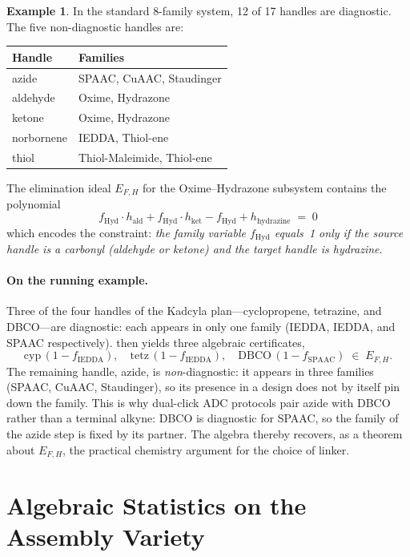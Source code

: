 \documentclass[preprint,12pt]{elsarticle}
\theoremstyle{definition}
\newtheorem{example}[theorem]{Example}
\theoremstyle{remark}
\begin{document}
\begin{example}\label{ex:diagnostic}
In the standard 8-family system, 12 of 17 handles are
diagnostic.  The five non-diagnostic handles are:
\begin{center}
\begin{tabular}{ll}
\toprule
Handle & Families \\
\midrule
azide & SPAAC, CuAAC, Staudinger \\
aldehyde & Oxime, Hydrazone \\
ketone & Oxime, Hydrazone \\
norbornene & IEDDA, Thiol-ene \\
thiol & Thiol-Maleimide, Thiol-ene \\
\bottomrule
\end{tabular}
\end{center}
The elimination ideal $E_{F,H}$ for the Oxime--Hydrazone
subsystem contains the polynomial
\[
  f_{\mathrm{Hyd}} \cdot h_{\mathrm{ald}}
  + f_{\mathrm{Hyd}} \cdot h_{\mathrm{ket}}
  - f_{\mathrm{Hyd}} + h_{\mathrm{hydrazine}} \;=\; 0
\]
which encodes the constraint: \emph{the family variable
$f_{\mathrm{Hyd}}$ equals~1 only if the source handle is a
carbonyl (aldehyde or ketone) and the target handle is hydrazine}.
\end{example}

\paragraph{On the running example.}
Three of the four handles of the Kadcyla plan---cyclopropene,
tetrazine, and DBCO---are diagnostic: each appears in only one
family (IEDDA, IEDDA, and SPAAC respectively).  
then yields three algebraic certificates,
\[
  \text{cyp}\,(1 - f_{\mathrm{IEDDA}}),\quad
  \text{tetz}\,(1 - f_{\mathrm{IEDDA}}),\quad
  \text{DBCO}\,(1 - f_{\mathrm{SPAAC}}) \;\in\; E_{F,H}.
\]
The remaining handle, azide, is \emph{non}-diagnostic:
it appears in three families (SPAAC, CuAAC, Staudinger),
so its presence in a design does not by itself pin down
the family.  This is why dual-click ADC protocols pair
azide with DBCO rather than a terminal alkyne: DBCO
is diagnostic for SPAAC, so the family of the azide
step is fixed by its partner.  The algebra thereby recovers, as a
theorem about $E_{F,H}$, the practical chemistry argument for
the choice of linker.


\section{Algebraic Statistics on the Assembly Variety}\label{sec:statistics}
\end{document}
